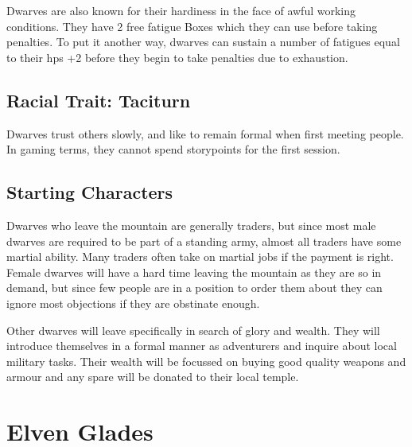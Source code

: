 \begin{multicols}{2}
Dwarves are also known for their hardiness in the face of awful working conditions.
They have 2 free \gls{fatigue} Boxes which they can use before taking penalties.
To put it another way, dwarves can sustain a number of \glspl{fatigue} equal to their \glspl{hp} +2 before they begin to take penalties due to exhaustion.

\subsection{Racial Trait: Taciturn}

Dwarves trust others slowly, and like to remain formal when first meeting people.
In gaming terms, they cannot spend \glspl{storypoint} for the first session.

\subsection{Starting Characters}

Dwarves who leave the mountain are generally traders, but since most male dwarves are required to be part of a standing army, almost all traders have some martial ability.
Many traders often take on martial jobs if the payment is right.
Female dwarves will have a hard time leaving the mountain as they are so in demand, but since few people are in a position to order them about they can ignore most objections if they are obstinate enough.

Other dwarves will leave specifically in search of glory and wealth. They will introduce themselves in a formal manner as adventurers and inquire about local military tasks. Their wealth will be focussed on buying good quality weapons and armour and any spare will be donated to their local temple.

\end{multicols}

\section[Elves]{Elven Glades}

